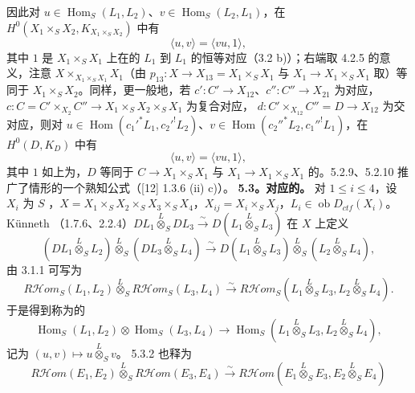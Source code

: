 因此对 $u\in\operatorname{Hom}_S(L_1,L_2)$、$v\in\operatorname{Hom}_S(L_2,L_1)$，在 $H^0(X_1\times_SX_2,K_{X_1\times_SX_2})$ 中有
\[\langle u,v\rangle=\langle vu,1\rangle,\tag{5.2.9}\]
其中 $1$ 是 $X_1\times_SX_1$ 上在的 $L_1$ 到 $L_1$ 的恒等对应（3.2 b)）；右端取 4.2.5 的意义，注意 $X\times_{X_1\times_SX_1}X_1$（由 $p_{13}:X\to X_{13}=X_1\times_SX_1$ 与 $X_1\to X_1\times_SX_1$ 取）等同于 $X_1\times_SX_2$。同样，更一般地，若 $c':C'\to X_{12}$、$c'':C''\to X_{21}$ 为对应，$c:C=C'\times_{X_2}C''\to X_1\times_SX_2\times_SX_1$ 为复合对应，
$d:C'\times_{X_{12}}C''=D\to X_{12}$ 为交对应，则对 $u\in\operatorname{Hom}(c_1'^*L_1,c_2'^!L_2)$、$v\in\operatorname{Hom}(c_2''^*L_2,c_1''^!L_1)$，在 $H^0(D,K_D)$ 中有
\[\langle u,v\rangle=\langle vu,1\rangle,\tag{5.2.10}\]
其中 $1$ 如上为，$D$ 等同于 $C\to X_1\times_SX_1$ 与 $X_1\to X_1\times_SX_1$ 的。5.2.9、5.2.10 推广了情形的一个熟知公式（[12] 1.3.6 (ii) c)）。
\textbf{5.3。对应的。} 对 $1\leq i\leq4$，设 $X_i$ 为 $S$ ，$X=X_1\times_SX_2\times_SX_3\times_SX_4$，$X_{ij}=X_i\times_SX_j$，$L_i\in\operatorname{ob}D_{ctf}(X_i)$。Künneth （1.7.6、2.2.4）$DL_1\mathbin{\overset L\otimes}_SDL_3\xrightarrow\sim D(L_1\mathbin{\overset L\otimes}_SL_3)$ 在 $X$ 上定义
\[(DL_1\mathbin{\overset L\otimes}_SL_2)\mathbin{\overset L\otimes}_S(DL_3\mathbin{\overset L\otimes}_SL_4)\xrightarrow\sim D(L_1\mathbin{\overset L\otimes}_SL_3)\mathbin{\overset L\otimes}_S(L_2\mathbin{\overset L\otimes}_SL_4),\tag{5.3.1}\]
由 3.1.1 可写为
\[R\mathcal Hom_S(L_1,L_2)\mathbin{\overset L\otimes}_SR\mathcal Hom_S(L_3,L_4)\xrightarrow\sim R\mathcal Hom_S(L_1\mathbin{\overset L\otimes}_SL_3,L_2\mathbin{\overset L\otimes}_SL_4).\tag{5.3.2}\]
于是得到称为的
\[\operatorname{Hom}_S(L_1,L_2)\otimes\operatorname{Hom}_S(L_3,L_4)\longrightarrow\operatorname{Hom}_S(L_1\mathbin{\overset L\otimes}_SL_3,L_2\mathbin{\overset L\otimes}_SL_4),\tag{5.3.3}\]
记为 $(u,v)\mapsto u\mathbin{\overset L\otimes}_Sv$。 5.3.2 也释为
\[R\mathcal Hom(E_1,E_2)\mathbin{\overset L\otimes}_SR\mathcal Hom(E_3,E_4)\xrightarrow\sim R\mathcal Hom(E_1\mathbin{\overset L\otimes}_SE_3,E_2\mathbin{\overset L\otimes}_SE_4)\]

